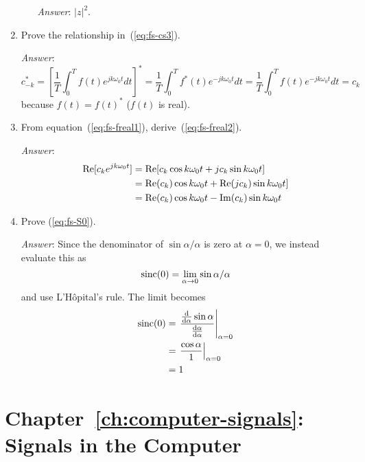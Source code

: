 \begin{enumerate}
\begin{enumerate}
    \textit{Answer}: $|z|^2$.
  \end{enumerate}

\item Prove the relationship in~(\ref{eq:fs-cs3}).\label{it:ch1ex8}

  \textit{Answer}:
  \begin{equation*}
    c_{-k}^* = \left[\frac{1}{T}\int_0^T f(t)e^{jk\omega_0t}dt\right]^*
    = \frac{1}{T}\int_0^T f^*(t)e^{-jk\omega_0t}dt
    = \frac{1}{T}\int_0^T f(t)e^{-jk\omega_0t}dt
    = c_k
  \end{equation*}
  because $f(t) = f(t)^*$ ($f(t)$ is real).

\item From equation~(\ref{eq:fs-freal1}),
  derive~(\ref{eq:fs-freal2}).\label{it:ch1ex9}

  \textit{Answer}:
  \begin{align*}
    \operatorname{Re} [c_k e^{jk\omega_0t}]
    &= \operatorname{Re}[c_k\cos k\omega_0t + jc_k\sin k\omega_0t ]\\
    &= \operatorname{Re}(c_k)\cos k\omega_0t + \operatorname{Re}(jc_k)\sin k\omega_0t ]\\
    &= \operatorname{Re}(c_k)\cos k\omega_0t - \operatorname{Im}(c_k)\sin k\omega_0t
  \end{align*}

\item Prove (\ref{eq:fs-S0}).\label{it:ch1ex10}

  \textit{Answer}: Since
  the denominator of $\sin\alpha/\alpha$ is zero at $\alpha=0$, we
  instead evaluate this as
  \begin{equation*}
    \operatorname{sinc}(0) = \lim_{\alpha\rightarrow 0}\sin\alpha/\alpha
  \end{equation*}
  and use L'H\^{o}pital's rule. The limit becomes
  \begin{align*}
    \operatorname{sinc}(0) & =  \left.\frac{\frac{\mathrm{d} }{\mathrm{d} \alpha}\sin\alpha}
      {\frac{\mathrm{d} \alpha}{\mathrm{d} \alpha}}\right|_{\alpha=0} \\
    & =  \left.\frac{\cos\alpha}{1}\right|_{\alpha=0} \\
    & =  1
  \end{align*}

\end{enumerate}

\section{Chapter~\ref{ch:computer-signals}: Signals in the Computer}
\label{sc:ch2ex}

